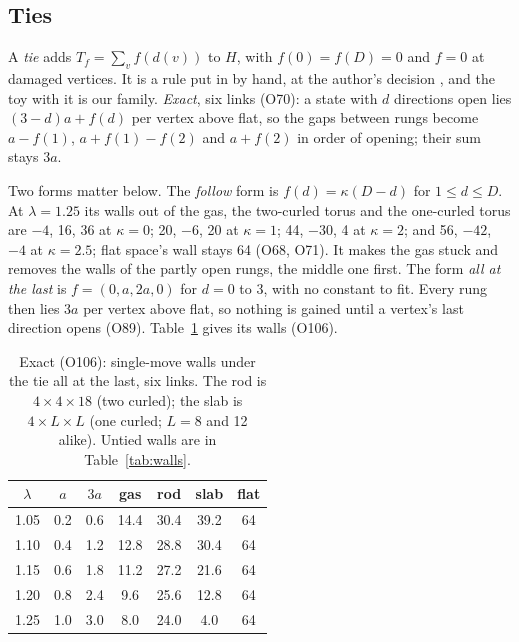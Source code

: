 \documentclass[aps,pre,10pt,twocolumn,superscriptaddress,nofootinbib]{revtex4-2}
\begin{document}
\subsection{Ties}

A \emph{tie} adds $T_f = \sum_v f(d(v))$ to $H$, with $f(0) = f(D) = 0$ and $f = 0$ at damaged vertices. It is a rule
put in by hand, at the author's decision \cite{repo}, and the toy with it is our family. \emph{Exact}, six links
(O70): a state with $d$ directions open lies $(3 - d)a + f(d)$ per vertex above flat, so the gaps between rungs
become $a - f(1)$, $a + f(1) - f(2)$ and $a + f(2)$ in order of opening; their sum stays $3a$.

Two forms matter below. The \emph{follow} form is $f(d) = \kappa(D - d)$ for $1 \le d \le D$. At $\lambda = 1.25$
its walls out of the gas, the two-curled torus and the one-curled torus are $-4$, 16, 36 at $\kappa = 0$; 20, $-6$,
20 at $\kappa = 1$; 44, $-30$, 4 at $\kappa = 2$; and 56, $-42$, $-4$ at $\kappa = 2.5$; flat space's wall stays 64
(O68, O71). It makes the gas stuck and removes the walls of the partly open rungs, the middle one first. The form
\emph{all at the last} is $f = (0, a, 2a, 0)$ for $d = 0$ to 3, with no constant to fit. Every rung then lies $3a$
per vertex above flat, so nothing is gained until a vertex's last direction opens (O89). Table~\ref{tab:tied} gives
its walls (O106).

\begin{table}[b]
\caption{Exact (O106): single-move walls under the tie all at the last, six links. The rod is $4 \times 4 \times 18$
(two curled); the slab is $4 \times L \times L$ (one curled; $L = 8$ and 12 alike). Untied walls are in
Table~\ref{tab:walls}.}
\label{tab:tied}
\begin{ruledtabular}
\begin{tabular}{ccccccc}
$\lambda$ & $a$ & $3a$ & gas & rod & slab & flat \\
\hline
1.05 & 0.2 & 0.6 & 14.4 & 30.4 & 39.2 & 64 \\
1.10 & 0.4 & 1.2 & 12.8 & 28.8 & 30.4 & 64 \\
1.15 & 0.6 & 1.8 & 11.2 & 27.2 & 21.6 & 64 \\
1.20 & 0.8 & 2.4 & 9.6 & 25.6 & 12.8 & 64 \\
1.25 & 1.0 & 3.0 & 8.0 & 24.0 & 4.0 & 64 \\
\end{tabular}
\end{ruledtabular}
\end{table}
\end{document}
